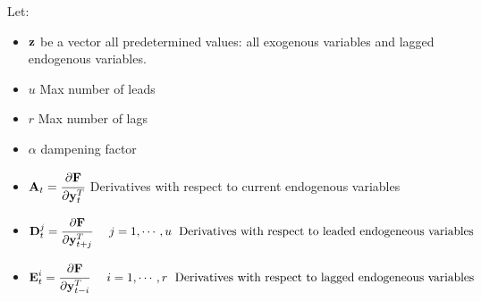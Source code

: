 \documentclass[letterpaper,10pt,english]{jupyterBook}
\begin{document}
\sphinxAtStartPar
Let:
\begin{itemize}
\item {} 
\sphinxAtStartPar
\(\bf{z}\) be a vector all predetermined values: all exogenous variables and lagged endogenous variables.

\item {} 
\sphinxAtStartPar
\(u\) Max number of leads

\item {} 
\sphinxAtStartPar
\(r\) Max number of lags

\item {} 
\sphinxAtStartPar
\(\alpha\) dampening factor

\item {} 
\sphinxAtStartPar
\(\textbf{A}_t = \cfrac{\partial \textbf{F}}{\partial \textbf{y}_t^T}\) Derivatives with respect to current endogenous variables

\item {} 
\sphinxAtStartPar
\(\textbf{D}_t^j =  \cfrac{\partial \textbf{F}}{\partial \textbf{y}_{t+j}^T } \hspace{5 mm} j=1, \cdots , u  \hspace{1 mm}\mbox{  Derivatives with respect to leaded endogeneous variables  }\)

\item {} 
\sphinxAtStartPar
\(\textbf{E}_t^i  =  \cfrac{\partial \textbf{F}}{\partial \textbf{y}_{t-i}^T } \hspace{5 mm} i=1, \cdots , r  \hspace{1 mm}\mbox{  Derivatives with respect to lagged endogeneous variables  }\)

\end{itemize}
\end{document}
